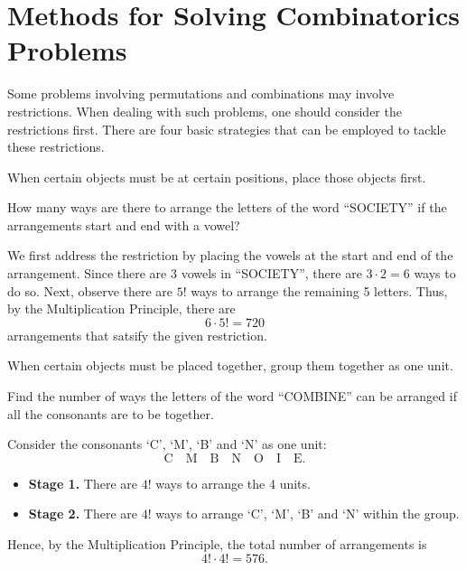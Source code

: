\section{Methods for Solving Combinatorics Problems}

Some problems involving permutations and combinations may involve restrictions. When dealing with such problems, one should consider the restrictions first. There are four basic strategies that can be employed to tackle these restrictions.

\begin{recipe}
    When certain objects must be at certain positions, place those objects first.
\end{recipe}

\begin{sample}
    How many ways are there to arrange the letters of the word ``SOCIETY'' if the arrangements start and end with a vowel?
\end{sample}
\begin{sampans}
    We first address the restriction by placing the vowels at the start and end of the arrangement. Since there are 3 vowels in ``SOCIETY'', there are $3 \cdot 2 = 6$ ways to do so. Next, observe there are $5!$ ways to arrange the remaining 5 letters. Thus, by the Multiplication Principle, there are \[6 \cdot 5! = 720\] arrangements that satsify the given restriction.
\end{sampans}

\begin{recipe}
    When certain objects must be placed together, group them together as one unit.
\end{recipe}

\begin{sample}
    Find the number of ways the letters of the word ``COMBINE'' can be arranged if all the consonants are to be together.
\end{sample}
\begin{sampans}
    Consider the consonants `C', `M', `B' and `N' as one unit: \[\boxed{\text{C} \quad \text{M} \quad \text{B} \quad \text{N}} \quad \boxed{\text{O}} \quad \boxed{\text{I}} \quad \boxed{\text{E}}.\]
    \begin{itemize}
        \item \textbf{Stage 1.} There are $4!$ ways to arrange the 4 units.
        \item \textbf{Stage 2.} There are $4!$ ways to arrange `C', `M', `B' and `N' within the group.
    \end{itemize}
    Hence, by the Multiplication Principle, the total number of arrangements is \[4! \cdot 4! = 576.\]
\end{sampans}

